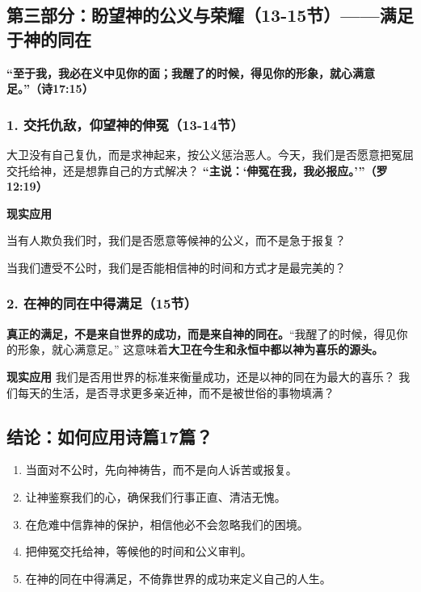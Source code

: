 \documentclass[a4paper, 12pt]{article}
\begin{document}
\subsection*{第三部分：盼望神的公义与荣耀（13-15节）——满足于神的同在  }
\textbf{“至于我，我必在义中见你的面；我醒了的时候，得见你的形象，就心满意足。”（诗17:15）}  

\subsubsection*{1. 交托仇敌，仰望神的伸冤（13-14节）}
\hspace{0.6cm}大卫没有自己复仇，而是求神起来，按公义惩治恶人。今天，我们是否愿意把冤屈交托给神，还是想靠自己的方式解决？  \textbf{“主说：‘伸冤在我，我必报应。’”（罗12:19）}  

\vspace{0.2cm}

\textbf{现实应用}

\hspace{0.6cm}当有人欺负我们时，我们是否愿意等候神的公义，而不是急于报复？

\hspace{0.6cm}当我们遭受不公时，我们是否能相信神的时间和方式才是最完美的？  

\subsubsection*{2. 在神的同在中得满足（15节） }
\hspace{0.6cm}\textbf{真正的满足，不是来自世界的成功，而是来自神的同在。}“我醒了的时候，得见你的形象，就心满意足。” 这意味着\textbf{大卫在今生和永恒中都以神为喜乐的源头。}  

\vspace{0.2cm}

\textbf{现实应用}
\hspace{0.6cm}我们是否用世界的标准来衡量成功，还是以神的同在为最大的喜乐？  
\hspace{0.6cm}我们每天的生活，是否寻求更多亲近神，而不是被世俗的事物填满？  



\subsection*{结论：如何应用诗篇17篇？}

\begin{enumerate}
    \item 当面对不公时，先向神祷告，而不是向人诉苦或报复。
    \item 让神鉴察我们的心，确保我们行事正直、清洁无愧。
    \item 在危难中信靠神的保护，相信他必不会忽略我们的困境。
    \item 把伸冤交托给神，等候他的时间和公义审判。
    \item 在神的同在中得满足，不倚靠世界的成功来定义自己的人生。
\end{enumerate}
\end{document}
